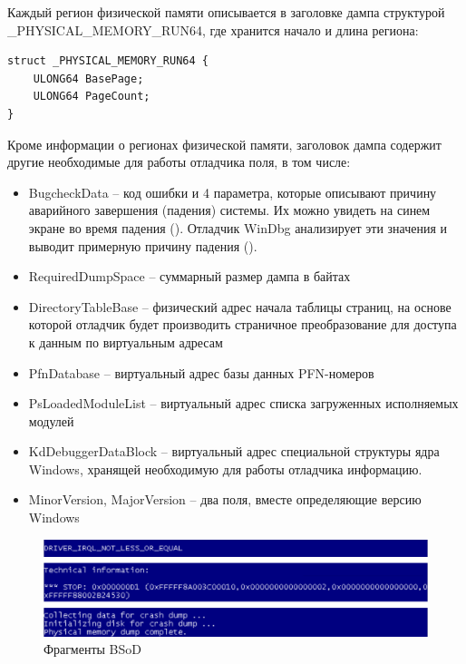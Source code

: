 \documentclass{mipt-thesis-bs}
\begin{document}
Каждый регион физической памяти описывается в заголовке дампа структурой {\_}PHYSICAL{\_}MEMORY{\_}RUN64, где хранится начало и длина региона:

\begin{verbatim}
struct _PHYSICAL_MEMORY_RUN64 {
    ULONG64 BasePage;
    ULONG64 PageCount;
}
\end{verbatim}

Кроме информации о регионах физической памяти, заголовок дампа содержит другие необходимые для работы отладчика поля, в том числе:

\begin{itemize}
    \item BugcheckData -- код ошибки и 4 параметра, которые описывают причину аварийного завершения (падения) системы. Их можно увидеть на синем экране во время падения (). Отладчик WinDbg анализирует эти значения и выводит примерную причину падения ().
    \item RequiredDumpSpace -- суммарный размер дампа в байтах
    \item DirectoryTableBase -- физический адрес начала таблицы страниц, на основе которой отладчик будет производить страничное преобразование для доступа к данным по виртуальным адресам
    \item PfnDatabase -- виртуальный адрес базы данных PFN-номеров\cite{winternals2}
    \item PsLoadedModuleList -- виртуальный адрес списка загруженных исполняемых модулей
    \item KdDebuggerDataBlock -- виртуальный адрес специальной структуры ядра Windows, хранящей необходимую для работы отладчика информацию.
    \item MinorVersion, MajorVersion -- два поля, вместе определяющие версию Windows
\end{itemize}

\begin{figure}[h]
\begin{center}
    \includegraphics[width=1\textwidth]{dump.png}
    \caption{Фрагменты BSoD}
    \label{fig:bsod}
\end{center}
\end{figure}
\end{document}
